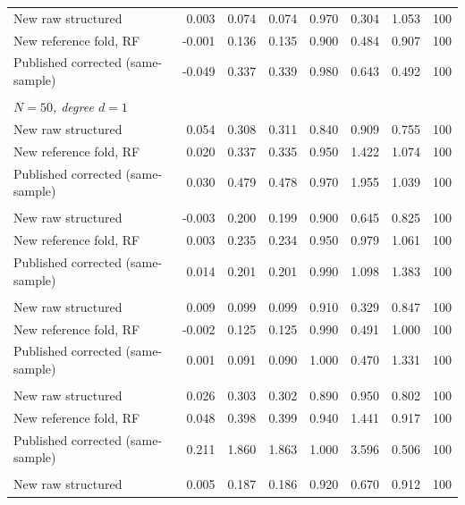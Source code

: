{\begin{longtable}{lrrrrrrr}
\quad New raw structured & 0.003 & 0.074 & 0.074 & 0.970 & 0.304 & 1.053 & 100 \\
\quad New reference fold, RF & -0.001 & 0.136 & 0.135 & 0.900 & 0.484 & 0.907 & 100 \\
\quad Published corrected (same-sample) & -0.049 & 0.337 & 0.339 & 0.980 & 0.643 & 0.492 & 100 \\
\addlinespace
\multicolumn{8}{l}{\textit{serial\_sweep}} \\
\multicolumn{8}{l}{\textit{$N=50$, degree $d=1$}} \\
\quad New raw structured & 0.054 & 0.308 & 0.311 & 0.840 & 0.909 & 0.755 & 100 \\
\quad New reference fold, RF & 0.020 & 0.337 & 0.335 & 0.950 & 1.422 & 1.074 & 100 \\
\quad Published corrected (same-sample) & 0.030 & 0.479 & 0.478 & 0.970 & 1.955 & 1.039 & 100 \\
\addlinespace
\multicolumn{8}{l}{\textit{$N=100$, degree $d=1$}} \\
\quad New raw structured & -0.003 & 0.200 & 0.199 & 0.900 & 0.645 & 0.825 & 100 \\
\quad New reference fold, RF & 0.003 & 0.235 & 0.234 & 0.950 & 0.979 & 1.061 & 100 \\
\quad Published corrected (same-sample) & 0.014 & 0.201 & 0.201 & 0.990 & 1.098 & 1.383 & 100 \\
\addlinespace
\multicolumn{8}{l}{\textit{$N=400$, degree $d=1$}} \\
\quad New raw structured & 0.009 & 0.099 & 0.099 & 0.910 & 0.329 & 0.847 & 100 \\
\quad New reference fold, RF & -0.002 & 0.125 & 0.125 & 0.990 & 0.491 & 1.000 & 100 \\
\quad Published corrected (same-sample) & 0.001 & 0.091 & 0.090 & 1.000 & 0.470 & 1.331 & 100 \\
\addlinespace
\multicolumn{8}{l}{\textit{$N=50$, degree $d=2$}} \\
\quad New raw structured & 0.026 & 0.303 & 0.302 & 0.890 & 0.950 & 0.802 & 100 \\
\quad New reference fold, RF & 0.048 & 0.398 & 0.399 & 0.940 & 1.441 & 0.917 & 100 \\
\quad Published corrected (same-sample) & 0.211 & 1.860 & 1.863 & 1.000 & 3.596 & 0.506 & 100 \\
\addlinespace
\multicolumn{8}{l}{\textit{$N=100$, degree $d=2$}} \\
\quad New raw structured & 0.005 & 0.187 & 0.186 & 0.920 & 0.670 & 0.912 & 100 \\

\end{longtable}}
